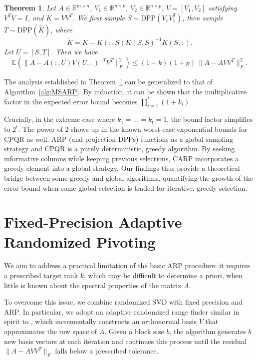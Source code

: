 \documentclass[11pt]{article}
\newtheorem{theorem}{Theorem}[section]
\newcommand{\<}{\langle}
\renewcommand{\>}{\rangle}
\begin{document}
\begin{theorem}
\label{thm:CARP}
    Let $A \in \mathbb{R}^{m \times n}$, $V_1 \in \mathbb{R}^{n \times k}$, $V_2 \in \mathbb{R}^{n \times p}$, 
    $V = [V_1, V_2]$ satisfying $V^TV = I$, and $K = V V^T$.
    We first sample $S \sim \mathrm{DPP}(V_1 V_1^T)$, then sample $T \sim \mathrm{DPP}(\widetilde{K})$,
    where
    \[
    \widetilde{K} = K - K(:,S) K(S,S)^{-1} K(S,:).
\]
Let $U = [S, T]$. Then we have
\[
\mathbb{E}\!\left( \| A - A(:,U)  V(U,:)^{-T} V^T \|_F^2 \right)
\le (1+k)(1+p)\, \| A -  A VV^T \|_F^2.
\]
\end{theorem}

The analysis established in Theorem~\ref{thm:CARP} can be generalized to that of Algorithm~\ref{alg:MSARP}. By induction, it can be shown that the multiplicative factor in the expected error bound becomes $\prod_{i=1}^t (1+k_i)$. 

Crucially, in the extreme case where $k_1 = \dots = k_t = 1$, the bound factor simplifies to $2^t$. The power of $2$ shows up in the known worst-case exponential bounds for CPQR\cite{srrqr} as well. ARP (and projection DPPs) functions as a global sampling strategy and CPQR is a purely deterministic, greedy algorithm. By seeking informative columns while keeping previous selections, CARP incorporates a greedy element into a global strategy. Our findings thus provide a theoretical bridge between some greedy and global algorithms, quantifying the growth of the error bound when some global selection is traded for iterative, greedy selection.


%
\section{Fixed-Precision Adaptive Randomized Pivoting}
\label{sec:arp_tol}
We aim to address a practical limitation of the basic ARP procedure: it requires a prescribed target rank $k$, which may be difficult to determine a priori, when little is known about the spectral properties of the matrix $A$.

To overcome this issue, we combine randomized SVD with fixed precision \cite{svdsketch_fixed_precision} and ARP. In particular, we adopt an adaptive randomized range finder similar in spirit to \cite{halko_finding_2010, svdsketch_fixed_precision}, which incrementally constructs an orthonormal basis $V$ that approximates the row space of $A$. Given a block size $b$, the algorithm generates $b$ new basis vectors at each iteration and continues this process until the residual $\|A - AVV^T\|_F$ falls below a prescribed tolerance.
\end{document}

